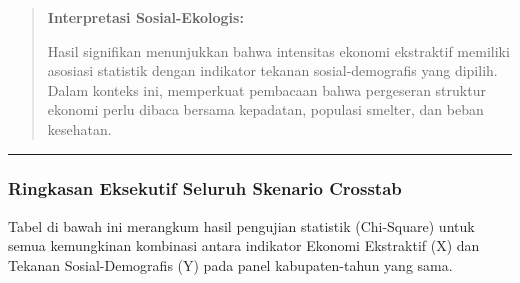 \documentclass[
]{article}
\begin{document}
\begin{quote}
\textbf{Interpretasi Sosial-Ekologis:}

Hasil signifikan menunjukkan bahwa intensitas ekonomi ekstraktif
memiliki asosiasi statistik dengan indikator tekanan sosial-demografis
yang dipilih. Dalam konteks ini, memperkuat pembacaan bahwa pergeseran
struktur ekonomi perlu dibaca bersama kepadatan, populasi smelter, dan
beban kesehatan.
\end{quote}

\begin{center}\rule{0.5\linewidth}{0.5pt}\end{center}

\subsubsection{Ringkasan Eksekutif Seluruh Skenario
Crosstab}\label{ringkasan-eksekutif-seluruh-skenario-crosstab}

Tabel di bawah ini merangkum hasil pengujian statistik (Chi-Square)
untuk semua kemungkinan kombinasi antara indikator Ekonomi Ekstraktif
(X) dan Tekanan Sosial-Demografis (Y) pada panel kabupaten-tahun yang
sama.
\end{document}
